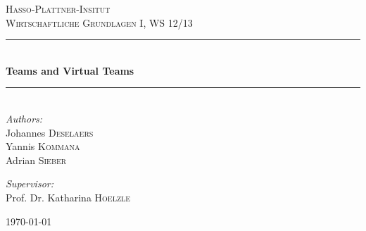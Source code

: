 \begin{titlepage}

\begin{center}



\textsc{\LARGE Hasso-Plattner-Insitut}\\[1.5cm]

\textsc{\Large Wirtschaftliche Grundlagen I, WS 12/13}
\\[0.5cm]


\rule{\linewidth}{0.5mm} \\[0.4cm]
{ \huge \bfseries Teams and Virtual Teams}\\[0.4cm]
\rule{\linewidth}{0.5mm} \\[1.5cm]


	\emph{Authors:}\\
	Johannes \textsc{Deselaers}\\
	Yannis \textsc{Kommana}\\
	Adrian \textsc{Sieber}

\vspace{1cm}

	\emph{Supervisor:} \\
	Prof. Dr. Katharina \textsc{Hoelzle}


\vfill

{\large \today}
\end{center}



\end{titlepage}